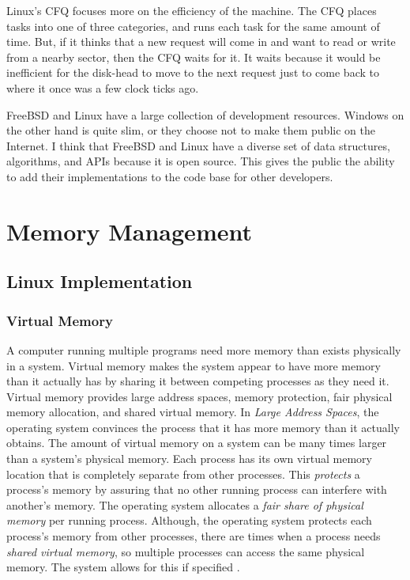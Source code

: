 \documentclass[onecolumn,draftclsnofoot, 10pt, compsoc]{IEEEtran}
\begin{document}
		Linux's CFQ focuses more on the efficiency of the machine. 
		The CFQ places tasks into one of three categories, and runs each task for the same amount of time.
		But, if it thinks that a new request will come in and want to read or write from a nearby sector, then the CFQ waits for it.
		It waits because it would be inefficient for the disk-head to move to the next request just to come back to where it once was a few clock ticks ago.
		
		FreeBSD and Linux have a large collection of development resources. 
		Windows on the other hand is quite slim, or they choose not to make them public on the Internet.
		I think that FreeBSD and Linux have a diverse set of data structures, algorithms, and APIs because it is open source. This gives the public the ability to add their implementations to the code base for other developers.
	
	
\section{Memory Management}
	\subsection{Linux Implementation}
		\subsubsection{Virtual Memory}
			A computer running multiple programs need more memory than exists physically in a system. 
			Virtual memory makes the system appear to have more memory than it actually has by sharing it between competing processes as they need it.
			Virtual memory provides large address spaces, memory protection, fair physical memory allocation, and shared virtual memory.
			In\textit{ Large Address Spaces}, the operating system convinces the process that it has more memory than it actually obtains.
			The amount of virtual memory on a system can be many times larger than a system's physical memory.
			Each process has its own virtual memory location that is completely separate from other processes. This \textit{protects} a process's memory by assuring that no other running process can interfere with another's memory. 
			The operating system allocates a \textit{fair share of physical memory} per running process.
			Although, the operating system protects each process's memory from other processes, there are times when a process needs \textit{shared virtual memory}, so multiple processes can access the same physical memory.
			The system allows for this if specified \cite{linuxMM}.
			
\end{document}
